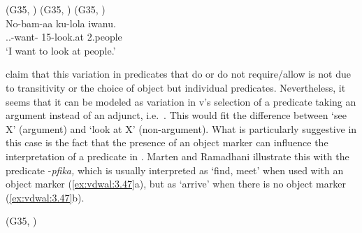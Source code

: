 \documentclass[output=paper]{langsci/langscibook}
\begin{document}
\ea\label{ex:vdwal:3.44}  (G35, \citealt[264--265]{MartenRamadhani2001})
	\z
\ex\label{ex:vdwal:3.45}  (G35, \citealt[264--265]{MartenRamadhani2001})
	\z
\ex\label{ex:vdwal:3.46}  (G35, \citealt[264--265]{MartenRamadhani2001}) \label{bkm:Ref347659685}\\
    \gll No-bam-aa  ku-lola  iwanu.\\
    \Fsg.\Sm.\Tns{}{}-want-\Fv{}  15-look.at  2.people\\
    \glt ‘I want to look at people.’
\z

\citet{MartenRamadhani2001} claim that this variation in predicates that do or
do not require/allow  is not due to transitivity or the choice of
object but individual predicates. Nevertheless, it seems that it can be modeled
as variation in v’s selection of a predicate taking an argument instead of an
adjunct, i.e.\ . This would fit the difference between ‘see X’
(argument) and ‘look at X’ (non-argument). What is particularly suggestive in
this case is the fact that the presence of an object marker can influence the
interpretation of a predicate in . Marten and Ramadhani illustrate this
with the predicate -\emph{pfika,} which is usually interpreted as ‘find, meet’
when used with an object marker (\ref{ex:vdwal:3.47}a), but as ‘arrive’ when there
is no object marker (\ref{ex:vdwal:3.47}b).

\ea\label{ex:vdwal:3.47}  (G35, \citealt[265--266]{MartenRamadhani2001})
    \z
\z
\end{document}
